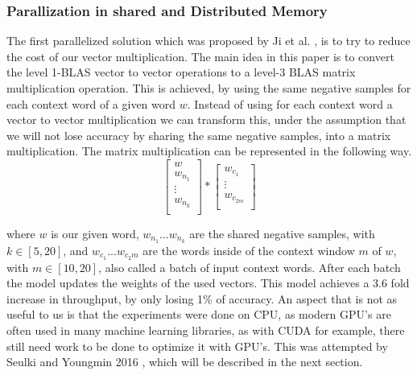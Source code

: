 \subsubsection{Parallization in shared and Distributed Memory}
The first parallelized solution which was proposed by Ji et al. \cite{intel}, is to try to reduce the cost of our vector multiplication. The main idea in this paper is to convert the level 1-BLAS vector to vector operations to a level-3 BLAS matrix multiplication operation. This is achieved, by using the same negative samples for each context word of a given word $w$. Instead of using for each context word a vector to vector multiplication we can transform this, under the assumption that we will not lose accuracy by sharing the same negative samples,  into a matrix multiplication. The matrix multiplication can be represented in the following way.
\[
\begin{bmatrix}
w \\
w_{n_1}  \\
\vdots \\
w_{n_k}\\
\end{bmatrix}
*
\begin{bmatrix}
w_{c_1}\\
\vdots\\
w_{c_{2m}}\\
\end{bmatrix}
\]

where $w$ is our given word, $w_{n_1}...w_{n_k}$ are the shared negative samples, with $k \in [5,20]$, and $w_{c_1}...w_{c_2m}$ are the words inside of the context window $m$ of $w$, with $m \in [10,20]$, also called a batch of input context words. After each batch the model updates the weights of the used vectors. 
This model achieves a 3.6 fold increase in throughput, by only losing 1\% of accuracy.  An aspect that is not as useful to us is that the experiments were done on CPU, as modern GPU's are often used in many machine learning libraries, as with CUDA for example, there still need work to be done to optimize it with GPU's. This was attempted by Seulki and Youngmin 2016 \cite{gpu}, which will be described in the next section.


